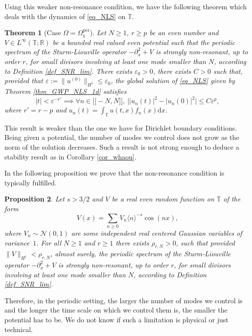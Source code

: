 \documentclass[11pt]{article}
\let\epsilon\varepsilon
\newcommand{\llbracket}{\mathopen{[\!\![}}
\newcommand{\rrbracket}{\mathclose{]\!\!]}}
\newtheorem{theorem}{Theorem}[section]
\newtheorem{proposition}[theorem]{Proposition}
\theoremstyle{definition}
\begin{document}
Using this weaker non-resonance condition, we have the following theorem which deals with the dynamics of \eqref{eq_NLS} on $\mathbb{T}$.
\begin{theorem}[Case $\Omega = \Omega^{\mathrm{per}}_1$]
\label{thm_per_1d}
Let $N\geq 1$, $r\geq p$ be an even number and $V \in L^\infty(\mathbb{T}; \mathbb{R})$ be a bounded real valued even potential such that the periodic spectrum of the Sturm-Liouville operator $-\partial_x^2 +V$ is strongly non-resonant, up to order $r$, for small divisors involving at least one mode smaller than $N$, according to Definition \ref{def_SNR_lim}. There exists $\epsilon_0>0$, there exists $C>0$ such that, provided that $\varepsilon:= \| u^{(0)} \|_{H^1} \leq \epsilon_{0}$,
the global solution of \eqref{eq_NLS} given by Theorem \ref{thm_GWP_NLS_1d} satisfies
\[
|t|< \varepsilon^{-r'} \implies \forall n \in \llbracket-N,N \rrbracket, \ \big| |u_n(t)|^2 - |u_n(0)|^2 \big| \leq C \varepsilon^p,
\]
where $r'=r-p$ and $u_n(t) = \int_\mathbb{T} u(t,x) f_n(x) \mathrm{d}x$.
\end{theorem}
This result is weaker than the one we have for Dirichlet boundary conditions. Being given a potential, the number of modes we control does not grow as the norm of the solution decreases. Such a result is not strong enough to deduce a stability result as in Corollary \ref{cor_whaou}.

In the following proposition we prove that the non-resonance condition is typically fulfilled.

\begin{proposition}
\label{prop_proba_per_1d}
Let $s>3/2$ and $V$ be a real even random function on $\mathbb{T}$ of the form
\[
V(x) = \sum_{n \geq 0 } V_n \langle n \rangle^{-s} \cos(n x),
\]
where $V_n \sim \mathcal{N}(0,1)$ are some independent real centered Gaussian variables of variance~$1$. For all $N\!\geq\!1$ and $r\!\geq\!1$ there exists $\rho_{r,N}\!>\!0$, such that provided $\|V\|_{H^1}\!<\!\rho_{r,N}$, almost surely, the periodic spectrum of the Sturm-Liouville operator $-\partial_x^2 +V$ is strongly non-resonant, up to order $r$, for small divisors involving at least one mode smaller than $N$, according to Definition \ref{def_SNR_lim}.
\end{proposition}
Therefore, in the periodic setting, the larger the number of modes we control is and the longer the time scale on which we control them is, the smaller the potential has to be. We do not know if such a limitation is physical or just technical.
\end{document}
